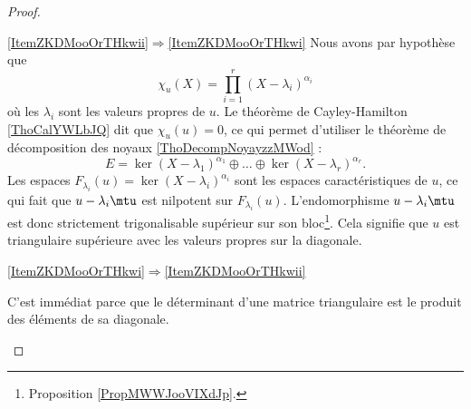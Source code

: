 \begin{proof}
    \begin{subproof}
        \item[\ref{ItemZKDMooOrTHkwii}\( \Rightarrow\)\ref{ItemZKDMooOrTHkwi}]
            Nous avons par hypothèse que
            \begin{equation}
                \chi_u(X)=\prod_{i=1}^r(X-\lambda_i)^{\alpha_i}
            \end{equation}
            où les \( \lambda_i\) sont les valeurs propres de \( u\). Le théorème de Cayley-Hamilton \ref{ThoCalYWLbJQ} dit que \( \chi_u(u)=0\), ce qui permet d'utiliser le théorème de décomposition des noyaux \ref{ThoDecompNoyayzzMWod} :
            \begin{equation}
                E=\ker(X-\lambda_1)^{\alpha_1}\oplus\ldots\oplus\ker(X-\lambda_r)^{\alpha_r}.
            \end{equation}
            Les espaces \( F_{\lambda_i}(u)=\ker(X-\lambda_i)^{\alpha_i}\) sont les espaces caractéristiques de \( u\), ce qui fait que \( u-\lambda_i\mtu\) est nilpotent sur \( F_{\lambda_i}(u)\). L'endomorphisme \( u-\lambda_i\mtu\) est donc strictement trigonalisable supérieur sur son bloc\footnote{Proposition \ref{PropMWWJooVIXdJp}.}. Cela signifie que \( u\) est triangulaire supérieure avec les valeurs propres sur la diagonale.

        \item[\ref{ItemZKDMooOrTHkwi}\( \Rightarrow\)\ref{ItemZKDMooOrTHkwii}]

            C'est immédiat parce que le déterminant d'une matrice triangulaire est le produit des éléments de sa diagonale.
    \end{subproof}
\end{proof}

